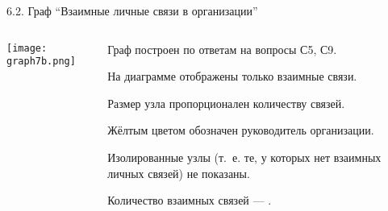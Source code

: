\begin{frame}{6.2. Граф ``Взаимные личные связи в организации''}

\begin{columns}
\begin{column}{0.75\textwidth} 
\centering
          \texttt{[image: graph7b.png]}
\end{column}
\begin{column}{0.25\textwidth} 
\tiny
Граф построен по ответам на вопросы С5, С9.
\smallskip

На диаграмме отображены только взаимные связи.
\smallskip

Размер узла пропорционален количеству связей.
\smallskip

Жёлтым цветом обозначен руководитель организации.
\smallskip

Изолированные узлы (т.~е. те, у которых нет взаимных личных связей) не показаны.
\bigskip

Количество взаимных связей --- \valGBlinks.

\end{column}
\end{columns}
\end{frame}



